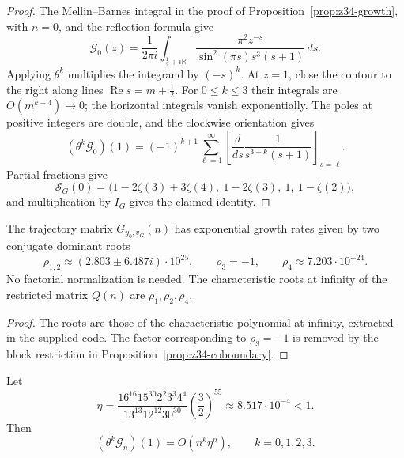 \begin{proof}
The Mellin--Barnes integral in the proof of
Proposition~\ref{prop:z34-growth}, with $n=0$, and the reflection formula
\cite[Eq.~5.5.3]{NIST:DLMF} give
\[
\mathcal{G}_0(z)=\frac{1}{2\pi i}\int_{\frac12+i\mathbb R}
\frac{\pi^2z^{-s}}{\sin^2(\pi s)s^3(s+1)}\,ds.
\]
Applying $\theta^k$ multiplies the integrand by $(-s)^k$.
At $z=1$, close the contour to the right along lines
$\operatorname{Re}s=m+\tfrac12$. For $0\leq k\leq3$ their integrals are
$O(m^{k-4})\to0$; the horizontal integrals vanish exponentially.
The poles at positive integers are double, and the clockwise orientation gives
\[
(\theta^k\mathcal{G}_0)(1)
=(-1)^{k+1}\sum_{\ell=1}^{\infty}
\left[\frac{d}{ds}\frac{1}{s^{3-k}(s+1)}\right]_{s=\ell}.
\]
Partial fractions give
\[
\mathcal{S}_G(0)=\bigl(
1-2\zeta(3)+3\zeta(4),\ 1-2\zeta(3),\ 1,\ 1-\zeta(2)\bigr),
\]
and multiplication by $I_G$ gives the claimed identity.
\end{proof}

\begin{proposition}
\label{prop:z34-rates}
The trajectory matrix $G_{y_0,v_G}(n)$ has exponential growth rates given by
two conjugate dominant roots
\[
\rho_{1,2}\approx(2.803\pm6.487i)\cdot10^{25},
\qquad \rho_3=-1,
\qquad \rho_4\approx7.203\cdot10^{-24}.
\]
No factorial normalization is needed. The characteristic roots at infinity
of the restricted matrix $Q(n)$ are $\rho_1,\rho_2,\rho_4$.
\end{proposition}

\begin{proof}
The roots are those of the characteristic polynomial at infinity, extracted
in the supplied code. The factor corresponding to $\rho_3=-1$ is removed
by the block restriction in Proposition~\ref{prop:z34-coboundary}.
\end{proof}

\begin{proposition}
\label{prop:z34-growth}
Let
\[
\eta=\frac{16^{16}15^{30}2^2 3^3 4^4}{13^{13}12^{12}30^{30}}
\left(\frac32\right)^{55}\approx8.517\cdot10^{-4}<1.
\]
Then
\[
(\theta^k\mathcal{G}_n)(1)=O(n^k\eta^n),
\qquad k=0,1,2,3.
\]
\end{proposition}

